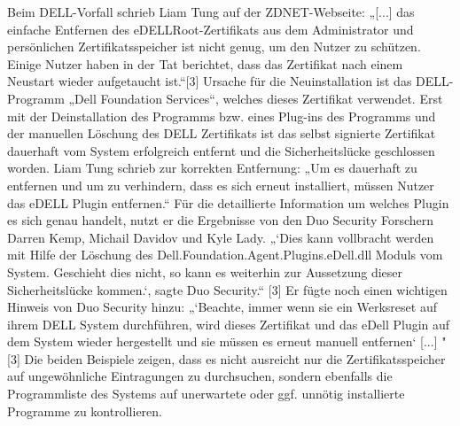 Beim DELL-Vorfall schrieb Liam Tung auf der ZDNET-Webseite: „[...] das einfache Entfernen des eDELLRoot-Zertifikats aus dem Administrator und persönlichen Zertifikatsspeicher ist nicht genug, um den Nutzer zu schützen. Einige Nutzer haben in der Tat berichtet, dass das Zertifikat nach einem Neustart wieder aufgetaucht ist.“[3]  Ursache für die Neuinstallation ist das DELL-Programm „Dell Foundation Services“, welches dieses Zertifikat verwendet. Erst mit der Deinstallation des Programms bzw. eines Plug-ins des Programms und der manuellen Löschung des DELL Zertifikats ist das selbst signierte Zertifikat dauerhaft vom System erfolgreich entfernt und die Sicherheitslücke geschlossen worden. Liam Tung schrieb zur korrekten Entfernung: „Um es dauerhaft zu entfernen und um zu verhindern, dass es sich erneut installiert, müssen Nutzer das eDELL Plugin entfernen.“ Für die detaillierte Information um welches Plugin es sich genau handelt, nutzt er die Ergebnisse von den Duo Security Forschern Darren Kemp, Michail Davidov und Kyle Lady. „‘Dies kann vollbracht werden mit Hilfe der Löschung des Dell.Foundation.Agent.Plugins.eDell.dll Moduls vom System. Geschieht dies nicht, so kann es weiterhin zur Aussetzung dieser Sicherheitslücke kommen.‘, sagte Duo Security.“ [3] Er fügte noch einen wichtigen Hinweis von Duo Security hinzu: „‘Beachte, immer wenn sie ein Werksreset auf ihrem DELL System durchführen, wird dieses Zertifikat und das eDell Plugin auf dem System wieder hergestellt und sie müssen es erneut manuell entfernen‘ [...] " [3]
Die beiden Beispiele zeigen, dass es nicht ausreicht nur die Zertifikatsspeicher auf ungewöhnliche Eintragungen zu durchsuchen, sondern ebenfalls die Programmliste des Systems auf unerwartete oder ggf. unnötig installierte Programme zu kontrollieren.
